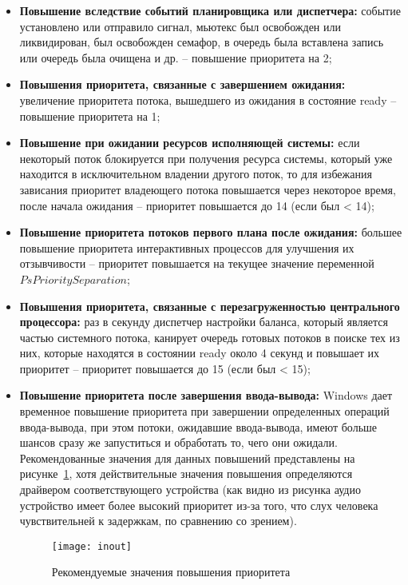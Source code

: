 \begin{itemize}
	\item \textbf{Повышение вследствие событий планировщика или диспетчера:} событие установлено или отправило сигнал, мьютекс был освобожден или ликвидирован, был освобожден семафор, в очередь была вставлена запись или очередь была очищена и др. -- повышение приоритета на 2;
	\item \textbf{Повышения приоритета, связанные с завершением ожидания:} увеличение приоритета потока, вышедшего из ожидания в состояние ready -- повышение приоритета на 1;
	\item \textbf{Повышение при ожидании ресурсов исполняющей системы:} если некоторый поток блокируется при получения ресурса системы, который уже находится в исключительном владении другого поток, то для избежания зависания приоритет владеющего потока повышается через некоторое время, после начала ожидания -- приоритет повышается до 14 (если был < 14);
	\item \textbf{Повышение приоритета потоков первого плана после ожидания:} большее повышение приоритета интерактивных процессов для улучшения их отзывчивости -- приоритет повышается на текущее значение переменной $PsPrioritySeparation$;
	\item \textbf{Повышения приоритета, связанные с перезагруженностью
	центрального процессора:} раз в секунду диспетчер настройки баланса, который является частью системного потока, канирует очередь готовых потоков в поиске тех из них, которые находятся в состоянии ready около 4 секунд и повышает их приоритет -- приоритет повышается до 15 (если был < 15);
	\item \textbf{Повышение приоритета после завершения ввода-вывода:} Windows дает временное повышение приоритета при завершении определенных операций ввода-вывода, при этом потоки, ожидавшие ввода-вывода, имеют	больше шансов сразу же запуститься и обработать то, чего они ожидали. Рекомендованные значения для данных повышений представлены на рисунке~\ref{fig:inout}, хотя действительные значения повышения определяются драйвером соответствующего устройства (как видно из рисунка аудио устройство имеет более высокий приоритет из-за того, что слух человека чувствительней к задержкам, по сравнению со зрением).
	\begin{figure}[H]
		\centering
		\texttt{[image: inout]}
		\caption{Рекомендуемые значения повышения приоритета}
		\label{fig:inout}
	\end{figure}
\end{itemize}

